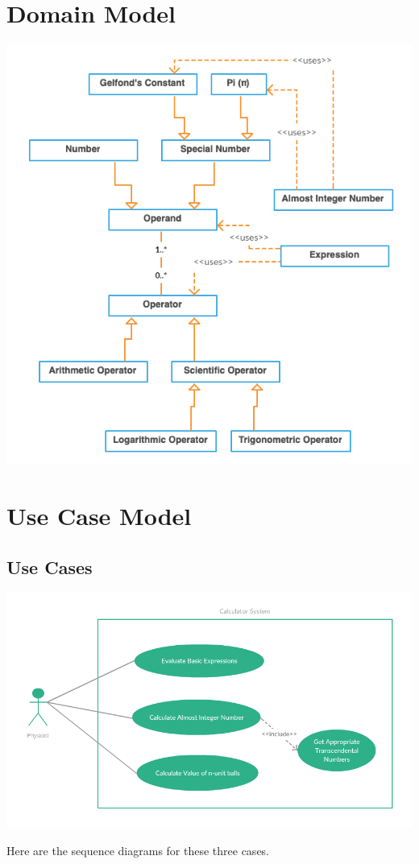 \documentclass{article}
\begin{document}
\section{Domain Model}
\begin{center}
    \includegraphics[scale=0.6]{images/n4-domain-model.png}
\end{center}

\clearpage

\section{Use Case Model}
\subsection{Use Cases}
\begin{center}
    \includegraphics[scale=0.45]{images/n4-use-case.png}
\end{center}
\begin{flushleft}
Here are the sequence diagrams for these three cases.
\end{flushleft}
\end{document}
